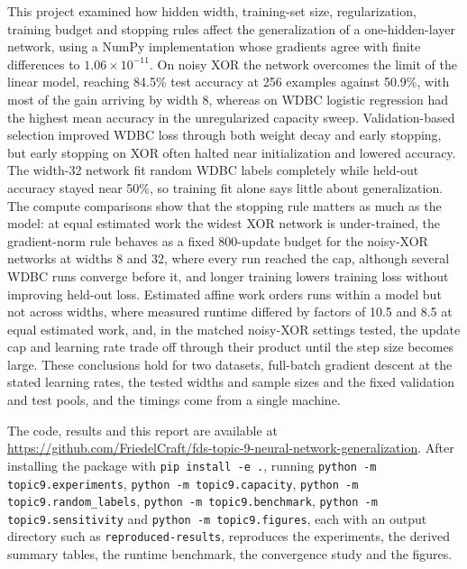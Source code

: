 \documentclass[11pt]{article}
\begin{document}
This project examined how hidden width, training-set size, regularization, training budget and stopping rules affect the generalization of a one-hidden-layer network, using a NumPy implementation whose gradients agree with finite differences to $1.06\times10^{-11}$. On noisy XOR the network overcomes the limit of the linear model, reaching 84.5\% test accuracy at 256 examples against 50.9\%, with most of the gain arriving by width 8, whereas on WDBC logistic regression had the highest mean accuracy in the unregularized capacity sweep. Validation-based selection improved WDBC loss through both weight decay and early stopping, but early stopping on XOR often halted near initialization and lowered accuracy. The width-32 network fit random WDBC labels completely while held-out accuracy stayed near 50\%, so training fit alone says little about generalization. The compute comparisons show that the stopping rule matters as much as the model: at equal estimated work the widest XOR network is under-trained, the gradient-norm rule behaves as a fixed 800-update budget for the noisy-XOR networks at widths 8 and 32, where every run reached the cap, although several WDBC runs converge before it, and longer training lowers training loss without improving held-out loss. Estimated affine work orders runs within a model but not across widths, where measured runtime differed by factors of 10.5 and 8.5 at equal estimated work, and, in the matched noisy-XOR settings tested, the update cap and learning rate trade off through their product until the step size becomes large. These conclusions hold for two datasets, full-batch gradient descent at the stated learning rates, the tested widths and sample sizes and the fixed validation and test pools, and the timings come from a single machine.

The code, results and this report are available at \url{https://github.com/FriedelCraft/fds-topic-9-neural-network-generalization}. After installing the package with \texttt{pip install -e .}, running \texttt{python -m topic9.experiments}, \texttt{python -m topic9.capacity}, \texttt{python -m topic9.random\_labels}, \texttt{python -m topic9.benchmark}, \texttt{python -m topic9.sensitivity} and \texttt{python -m topic9.figures}, each with an output directory such as \texttt{reproduced-results}, reproduces the experiments, the derived summary tables, the runtime benchmark, the convergence study and the figures.
\end{document}
